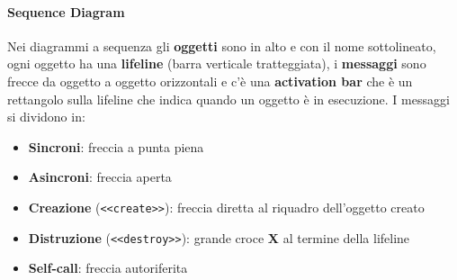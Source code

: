 \documentclass[12pt]{extarticle}
\begin{document}
\paragraph{Sequence Diagram} Nei diagrammi a sequenza gli \textbf{oggetti} sono in alto e con il nome sottolineato, ogni oggetto ha una \textbf{lifeline} (barra verticale tratteggiata), i \textbf{messaggi} sono frecce da oggetto a oggetto orizzontali e c'è una \textbf{activation bar} che è un rettangolo sulla lifeline che indica quando un oggetto è in esecuzione. I messaggi si dividono in:
\begin{itemize}
    \item \textbf{Sincroni}: freccia a punta piena
    \item \textbf{Asincroni}: freccia aperta
    \item \textbf{Creazione} (\texttt{<<create>>}): freccia diretta al riquadro dell'oggetto creato
    \item \textbf{Distruzione} (\texttt{<<destroy>>}): grande croce \textbf{X} al termine della lifeline
    \item \textbf{Self-call}: freccia autoriferita
\end{itemize}
\end{document}
